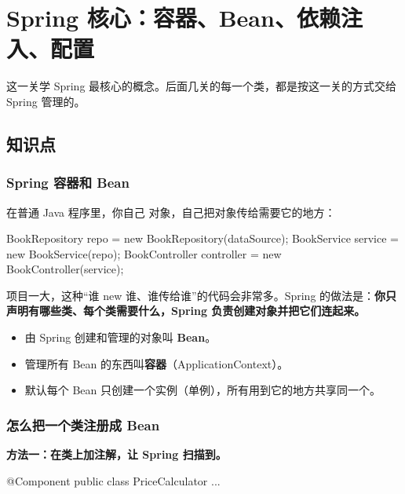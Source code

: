 \chapter{Spring 核心：容器、Bean、依赖注入、配置}

这一关学 Spring 最核心的概念。后面几关的每一个类，都是按这一关的方式交给 Spring 管理的。


\section{知识点}

\subsection{Spring 容器和 Bean}

在普通 Java 程序里，你自己  对象，自己把对象传给需要它的地方：

\begin{java}
BookRepository repo = new BookRepository(dataSource);
BookService service = new BookService(repo);
BookController controller = new BookController(service);
\end{java}

项目一大，这种“谁 new 谁、谁传给谁”的代码会非常多。Spring 的做法是：\textbf{你只声明有哪些类、每个类需要什么，Spring 负责创建对象并把它们连起来。}

\begin{itemize}
  \item 由 Spring 创建和管理的对象叫 \textbf{Bean}。
  \item 管理所有 Bean 的东西叫\textbf{容器}（ApplicationContext）。
  \item 默认每个 Bean 只创建一个实例（单例），所有用到它的地方共享同一个。
\end{itemize}

\subsection{怎么把一个类注册成 Bean}

\textbf{方法一：在类上加注解，让 Spring 扫描到。}

\begin{java}
@Component
public class PriceCalculator { ... }
\end{java}

